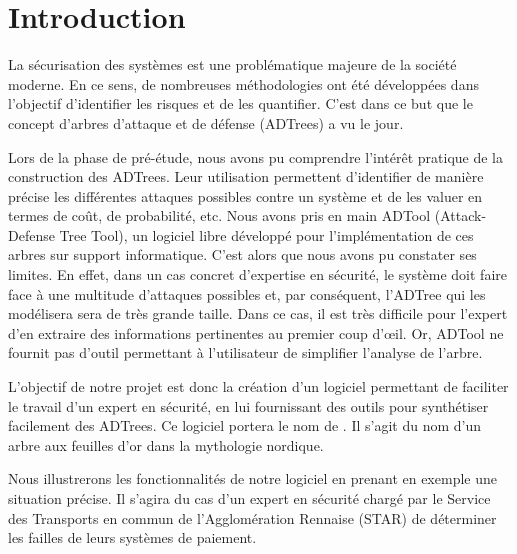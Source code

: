 \section{Introduction}
	La sécurisation des systèmes est une problématique majeure de la société moderne. En ce sens, de nombreuses méthodologies ont été développées \cite{introSecurite} dans l'objectif d'identifier les risques et de les quantifier. C'est dans ce but que le concept d'arbres d'attaque et de défense (ADTrees) a vu le jour.

	Lors de la phase de pré-étude, nous avons pu comprendre l’intérêt pratique de la construction des ADTrees. Leur utilisation permettent d'identifier de manière précise les différentes attaques possibles contre un système et de les valuer en termes de coût, de probabilité, etc. Nous avons pris en main ADTool\cite{adtool_paper} (Attack-Defense Tree Tool), un logiciel libre développé pour l'implémentation de ces arbres sur support informatique. C'est alors que nous avons pu constater ses limites. En effet, dans un cas concret d'expertise en sécurité, le système doit faire face à une multitude d'attaques possibles et, par conséquent, l'ADTree qui les modélisera sera de très grande taille. Dans ce cas, il est très difficile pour l'expert d'en extraire des informations pertinentes au premier coup d’œil. Or, ADTool ne fournit pas d'outil permettant à l'utilisateur de simplifier l'analyse de l'arbre. 

	L'objectif de notre projet est donc la création d'un logiciel permettant de faciliter le travail d'un expert en sécurité, en lui fournissant des outils pour synthétiser facilement des ADTrees. Ce logiciel portera le nom de \glasir. Il s'agit du nom d'un arbre aux feuilles d'or dans la mythologie nordique\cite{vikingCulture}.

	Nous illustrerons les fonctionnalités de notre logiciel en prenant en exemple une situation précise. Il s'agira du cas d'un expert en sécurité chargé par le Service des Transports en commun de l'Agglomération Rennaise (STAR) de déterminer les failles de leurs systèmes de paiement.